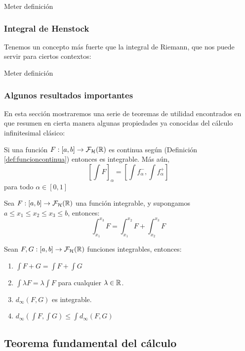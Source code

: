 \begin{definicion}
Meter definición
\end{definicion}

\subsubsection{Integral de Henstock}
Tenemos un concepto más fuerte que la integral de Riemann, que nos puede servir para ciertos contextos:
\begin{definicion}
	Meter definición
\end{definicion}

\subsubsection{Algunos resultados importantes}
En esta sección mostraremos una serie de teoremas de utilidad encontrados en \cite{integral2} que resumen en cierta manera algunas propiedades ya conocidas del cálculo infinitesimal clásico:

\begin{teorema}
	Si una función $F :  [a, b] \rightarrow \mathcal{F}_\mathcal{H}(\mathbb R)$ es continua según (Definición \ref{def:funcioncontinua}) entonces es integrable. Más aún,
	\[
		\left[
			\int F
		\right]_\alpha = \left[
			\int f_\alpha^-, \int f_\alpha^+
		\right]
	\] para todo $\alpha \in [0, 1]$
\end{teorema}

\begin{teorema}
	Sea $F :  [a, b] \rightarrow \mathcal{F}_\mathcal{H}(\mathbb R)$ una función integrable, y supongamos $a \leq x_1 \leq x_2 \leq x_3 \leq b$, entonces:
	\[
		\int_{x_1}^{x_3} F = \int_{x_1}^{x_2} F + \int_{x_2}^{x_3} F
	\]
\end{teorema}

\begin{teorema}
	Sean $F, G :  [a, b] \rightarrow \mathcal{F}_\mathcal{H}(\mathbb R)$ funciones integrables, entonces:
	
	\begin{enumerate}
		\item $\int F + G = \int F + \int G$
		\item $\int \lambda F = \lambda \int F$ para cualquier $\lambda \in \mathbb R$.
		\item $d_\infty(F, G)$ es integrable.
		\item $d_\infty(\int F, \int G) \leq \int d_\infty(F, G)$
	\end{enumerate}
\end{teorema}
\subsection{Teorema fundamental del cálculo}